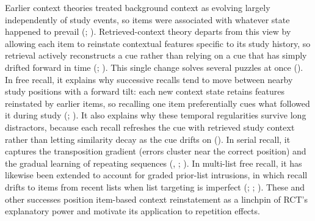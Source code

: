 \documentclass[
  man,
  floatsintext,
  longtable,
  nolmodern,
  notxfonts,
  notimes,
  draftfirst,
  colorlinks=true,linkcolor=blue,citecolor=blue,urlcolor=blue]{apa7}
\begin{document}
Earlier context theories treated background context as evolving largely
independently of study events, so items were associated with whatever
state happened to prevail (; ).
Retrieved-context theory departs from this view by allowing each item to
reinstate contextual features specific to its study history, so
retrieval actively reconstructs a cue rather than relying on a cue that
has simply drifted forward in time
(;
). This single
change solves several puzzles at once
(). In free
recall, it explains why successive recalls tend to move between nearby
study positions with a forward tilt: each new context state retains
features reinstated by earlier items, so recalling one item
preferentially cues what followed it during study
(;
). It also explains
why these temporal regularities survive long distractors, because each
recall refreshes the cue with retrieved study context rather than
letting similarity decay as the cue drifts on
(). In serial
recall, it captures the transposition gradient (errors cluster near the
correct position) and the gradual learning of repeating sequences
(,
;
). In multi-list free
recall, it has likewise been extended to account for graded prior-list
intrusions, in which recall drifts to items from recent lists when list
targeting is imperfect (; ;
). These and other
successes position item-based context reinstatement as a linchpin of
RCT's explanatory power and motivate its application to repetition
effects.
\end{document}
